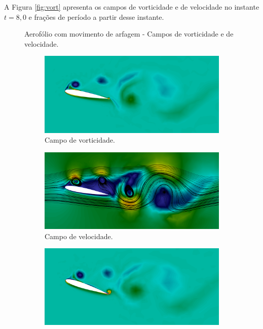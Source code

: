 A Figura \ref{fig:vort} apresenta os campos de vorticidade e de velocidade no instante $t=8,0$ e frações de período a partir desse instante.

\begin{figure}[h!]
    \centering
    \caption{Aerofólio com movimento de arfagem - Campos de vorticidade e de velocidade.}
    \begin{subfigure}{.49\linewidth}
        \centering
        \caption*{Campo de vorticidade.}
        \includegraphics[width=\linewidth]{Figuras/rotating-airfoil/vort1.png}
    \end{subfigure}
    \begin{subfigure}{.49\linewidth}
        \centering
        \caption*{Campo de velocidade.}
        \includegraphics[width=\linewidth]{Figuras/rotating-airfoil/str1.png}
    \end{subfigure}
    \caption*{Instante $t=8,0$.}
    \begin{subfigure}{.49\linewidth}
        \centering
        \includegraphics[width=\linewidth]{Figuras/rotating-airfoil/vort2.png}

\end{subfigure}
\end{figure}
